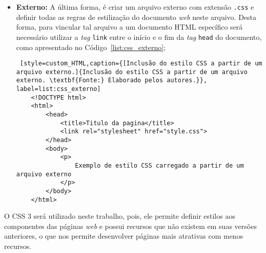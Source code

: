 \begin{itemize}
	\item \textbf{Externo:} A última forma, é criar um arquivo externo com extensão \texttt{.css} e definir todas as regras de estilização do documento \textit{web} neste arquivo. Desta forma, para vincular tal arquivo a um documento HTML específico será necessário utilizar a \textit{tag} \texttt{link} entre o início e o fim da \textit{tag} \texttt{head} do documento, como apresentado no Código~\ref{list:css_externo};
	
	\begin{lstlisting} [style=custom_HTML,caption={[Inclusão do estilo CSS a partir de um arquivo externo.]{Inclusão do estilo CSS a partir de um arquivo externo. \textbf{Fonte:} Elaborado pelos autores.}}, label=list:css_externo] 	
	<!DOCTYPE html>
	<html>
		<head>
			<title>Titulo da pagina</title>
			<link rel="stylesheet" href="style.css">
		</head>
		<body>
			<p>
				Exemplo de estilo CSS carregado a partir de um arquivo externo
			</p>
		</body>
	</html>
	\end{lstlisting}
	
	
\end{itemize}

O CSS 3 será utilizado neste trabalho, pois, ele permite definir estilos aos componentes das páginas \textit{web} e possui recursos que não existem em suas versões anteriores, o que nos permite desenvolver páginas mais atrativas com menos recursos.
